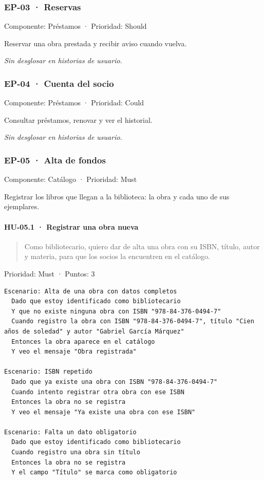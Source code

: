 \subsubsection*{EP-03 · Reservas}

Componente: Préstamos · Prioridad: Should

Reservar una obra prestada y recibir aviso cuando vuelva.

\emph{Sin desglosar en historias de usuario.}

\subsubsection*{EP-04 · Cuenta del socio}

Componente: Préstamos · Prioridad: Could

Consultar préstamos, renovar y ver el historial.

\emph{Sin desglosar en historias de usuario.}

\subsubsection*{EP-05 · Alta de fondos}

Componente: Catálogo · Prioridad: Must

Registrar los libros que llegan a la biblioteca: la obra y cada uno de sus ejemplares.

\paragraph*{HU-05.1 · Registrar una obra nueva}

\begin{quote}
Como bibliotecario, quiero dar de alta una obra con su ISBN, título, autor y materia, para que los socios la encuentren en el catálogo.
\end{quote}

Prioridad: Must · Puntos: 3

\begin{Verbatim}[breaklines,fontsize=\small,frame=single,framerule=0.4pt,rulecolor=\color{black!25}]
Escenario: Alta de una obra con datos completos
  Dado que estoy identificado como bibliotecario
  Y que no existe ninguna obra con ISBN "978-84-376-0494-7"
  Cuando registro la obra con ISBN "978-84-376-0494-7", título "Cien años de soledad" y autor "Gabriel García Márquez"
  Entonces la obra aparece en el catálogo
  Y veo el mensaje "Obra registrada"

Escenario: ISBN repetido
  Dado que ya existe una obra con ISBN "978-84-376-0494-7"
  Cuando intento registrar otra obra con ese ISBN
  Entonces la obra no se registra
  Y veo el mensaje "Ya existe una obra con ese ISBN"

Escenario: Falta un dato obligatorio
  Dado que estoy identificado como bibliotecario
  Cuando registro una obra sin título
  Entonces la obra no se registra
  Y el campo "Título" se marca como obligatorio
\end{Verbatim}

